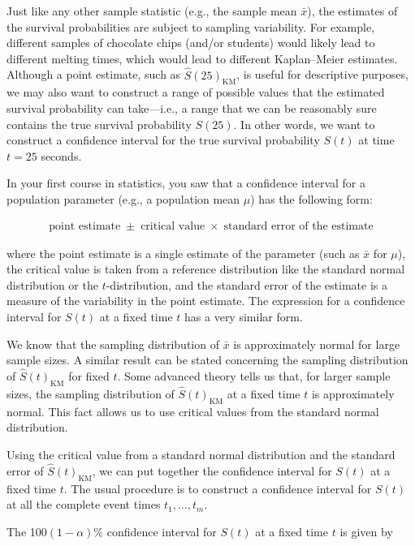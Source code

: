 \documentclass[
]{book}
\begin{document}
Just like any other sample statistic (e.g., the sample mean \(\bar x\)), the estimates of the survival probabilities are subject to sampling variability. For example, different samples of chocolate chips (and/or students) would likely lead to different melting times, which would lead to different Kaplan--Meier estimates. Although a point estimate, such as \(\hat S(25)_{\mathrm{KM}}\), is useful for descriptive purposes, we may also want to construct a range of possible values that the estimated survival probability can take---i.e., a range that we can be reasonably sure contains the true survival probability \(S(25)\). In other words, we want to construct a confidence interval for the true survival probability \(S(t)\) at time \(t = 25\) seconds.

In your first course in statistics, you saw that a confidence interval for a population parameter (e.g., a population mean \(\mu\)) has the following form:

\begin{align}\label{9.6}
\text{point estimate} \;\pm\; \text{critical value}\;\times\;\text{standard error of the estimate}
\tag{9.6}
\end{align}

where the point estimate is a single estimate of the parameter (such as \(\bar x\) for \(\mu\)), the critical value is taken from a reference distribution like the standard normal distribution or the \(t\)-distribution, and the standard error of the estimate is a measure of the variability in the point estimate. The expression for a confidence interval for \(S(t)\) at a fixed time \(t\) has a very similar form.

We know that the sampling distribution of \(\bar x\) is approximately normal for large sample sizes. A similar result can be stated concerning the sampling distribution of \(\hat S(t)_{\mathrm{KM}}\) for fixed \(t\). Some advanced theory tells us that, for larger sample sizes, the sampling distribution of \(\hat S(t)_{\mathrm{KM}}\) at a fixed time \(t\) is approximately normal. This fact allows us to use critical values from the standard normal distribution.

Using the critical value from a standard normal distribution and the standard error of \(\hat S(t)_{\mathrm{KM}}\), we can put together the confidence interval for \(S(t)\) at a fixed time \(t\). The usual procedure is to construct a confidence interval for \(S(t)\) at all the complete event times \(t_1,\dots,t_m\).

The 100\((1-\alpha)\%\) confidence interval for \(S(t)\) at a fixed time \(t\) is given by
\end{document}

